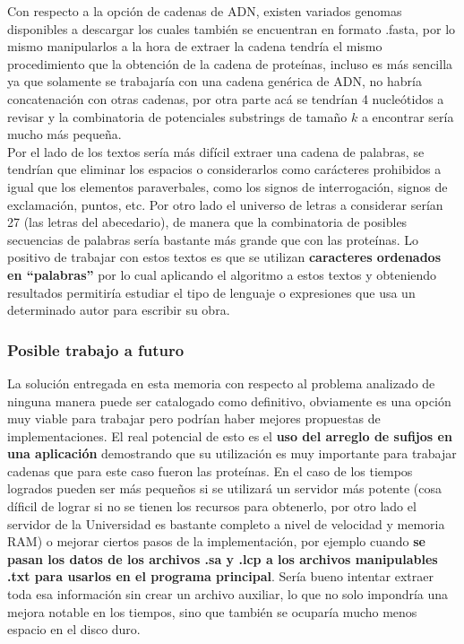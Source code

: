 Con respecto a la opción de cadenas de ADN, existen variados genomas disponibles a descargar los cuales también se encuentran en formato .fasta, por lo mismo manipularlos a la hora de extraer la cadena tendría el mismo procedimiento que la obtención de la cadena de proteínas, incluso es más sencilla ya que solamente se trabajaría con una cadena genérica de ADN, no habría concatenación con otras cadenas, por otra parte acá se tendrían 4 nucleótidos a revisar y la combinatoria de potenciales substrings de tamaño $k$ a encontrar sería mucho más pequeña.\\
Por el lado de los textos sería más difícil extraer una cadena de palabras, se tendrían que eliminar los espacios o considerarlos como carácteres prohibidos a igual que los elementos paraverbales, como los signos de interrogación, signos de exclamación, puntos, etc. Por otro lado el universo de letras a considerar serían 27 (las letras del abecedario), de manera que la combinatoria de posibles secuencias de palabras sería bastante más grande que con las proteínas. Lo positivo de trabajar con estos textos es que se utilizan \textbf{caracteres ordenados en ``palabras''} por lo cual aplicando el algoritmo a estos textos y obteniendo resultados permitiría estudiar el tipo de lenguaje o expresiones que usa un determinado autor para escribir su obra.

\subsubsection{Posible trabajo a futuro}

La solución entregada en esta memoria con respecto al problema analizado de ninguna manera puede ser catalogado como definitivo, obviamente es una opción muy viable para trabajar pero podrían haber mejores propuestas de implementaciones. El real potencial de esto es el \textbf{uso del arreglo de sufijos en una aplicación} demostrando que su utilización es muy importante para trabajar cadenas que para este caso fueron las proteínas. En el caso de los tiempos logrados pueden ser más pequeños si se utilizará un servidor más potente (cosa díficil de lograr si no se tienen los recursos para obtenerlo, por otro lado el servidor de la Universidad es bastante completo a nivel de velocidad y memoria RAM) o mejorar ciertos pasos de la implementación, por ejemplo cuando \textbf{se pasan los datos de los archivos .sa y .lcp a los archivos manipulables .txt para usarlos en el programa principal}. Sería bueno intentar extraer toda esa información sin crear un archivo auxiliar, lo que no solo impondría una mejora notable en los tiempos, sino que también se ocuparía mucho menos espacio en el disco duro.

